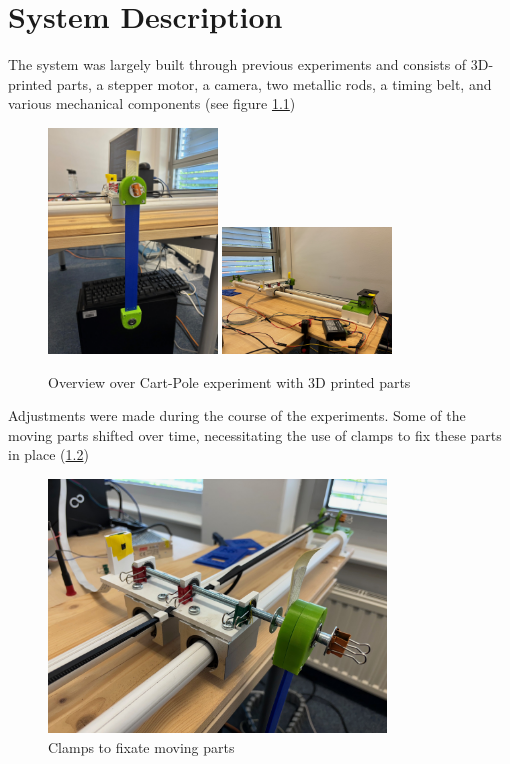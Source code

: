\chapter{System Description}

The system was largely built through previous experiments and consists of 3D-printed parts, a stepper motor, a camera, two metallic rods, a timing belt, and various mechanical components (see figure \ref{fig:overview_cart_pole_experiment})
\begin{figure}[htbp]
    \centering
    \includegraphics[width=0.4\textwidth]{img/front.jpg}
    \includegraphics[width=0.4\textwidth]{img/back.jpg}
    \caption{Overview over Cart-Pole experiment with 3D printed parts}
    \label{fig:overview_cart_pole_experiment}
\end{figure}
Adjustments were made during the course of the experiments. Some of the moving parts shifted over time, necessitating the use of clamps to fix these parts in place (\ref{fig:clamps})
\begin{figure}[htbp]
    \centering
    \includegraphics[width=0.8\textwidth]{img/clamps.jpg}
    \caption{Clamps to fixate moving parts}
    \label{fig:clamps}
\end{figure}

